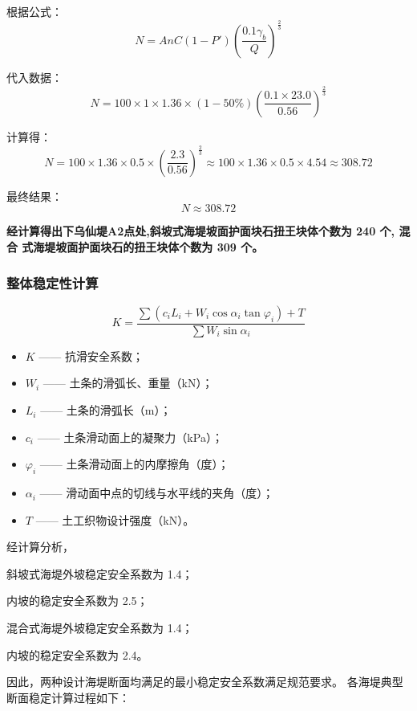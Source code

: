 \documentclass[UTF8, a4paper, 12pt]{ctexart} %
\begin{document}
根据公式：
\begin{equation}
    N = A n C (1 - P') \left( \frac{0.1 \gamma_b}{Q} \right)^{\frac{2}{3}}
\end{equation}

代入数据：
\[
    N = 100 \times 1 \times 1.36 \times (1 - 50\%) \left( \frac{0.1 \times 23.0}{0.56} \right)^{\frac{2}{3}}
\]

计算得：
\[
    N = 100 \times 1.36 \times 0.5 \times \left( \frac{2.3}{0.56} \right)^{\frac{2}{3}} \approx 100 \times 1.36 \times 0.5 \times 4.54 \approx 308.72
\]

最终结果：
\[
N \approx 308.72
\]




\textbf{经计算得出下乌仙堤A2点处,斜坡式海堤坡面护面块石扭王块体个数为 240 个, 混合
式海堤坡面护面块石的扭王块体个数为 309 个。}
\par
\subsubsection{整体稳定性计算}
\begin{equation}
    K = \frac{\sum \left( c_i L_i + W_i \cos \alpha_i \tan \varphi_i \right) + T}{\sum W_i \sin \alpha_i}
\end{equation}
\begin{itemize}
        \item $K$ —— 抗滑安全系数；
        \item $W_i$ —— 土条的滑弧长、重量（kN）；
        \item $L_i$ —— 土条的滑弧长（m）；
        \item $c_i$ —— 土条滑动面上的凝聚力（kPa）；
        \item $\varphi_i$ —— 土条滑动面上的内摩擦角（度）；
        \item $\alpha_i$ —— 滑动面中点的切线与水平线的夹角（度）；
        \item $T$ —— 土工织物设计强度（kN）。
\end{itemize}

经计算分析，

斜坡式海堤外坡稳定安全系数为 1.4；

内坡的稳定安全系数为 2.5；

混合式海堤外坡稳定安全系数为 1.4；

内坡的稳定安全系数为 2.4。

因此，两种设计海堤断面均满足的最小稳定安全系数满足规范要求。
各海堤典型断面稳定计算过程如下：
\end{document}
